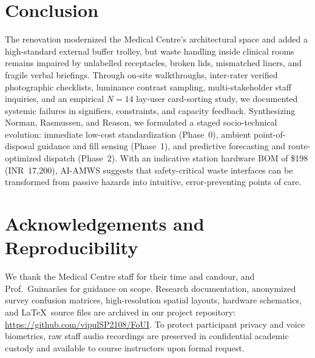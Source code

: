 \documentclass[10pt,twocolumn,a4paper]{article}
\begin{document}
\section{Conclusion}
The renovation modernized the Medical Centre's architectural space and added a high-standard external buffer trolley, but waste handling inside clinical rooms remains impaired by unlabelled receptacles, broken lids, mismatched liners, and fragile verbal briefings. Through on-site walkthroughs, inter-rater verified photographic checklists, luminance contrast sampling, multi-stakeholder staff inquiries, and an empirical $N=14$ lay-user card-sorting study, we documented systemic failures in signifiers, constraints, and capacity feedback. Synthesizing Norman, Rasmussen, and Reason, we formulated a staged socio-technical evolution: immediate low-cost standardization (Phase~0), ambient point-of-disposal guidance and fill sensing (Phase~1), and predictive forecasting and route-optimized dispatch (Phase~2). With an indicative station hardware BOM of \$198 (INR~17,200), AI-AMWS suggests that safety-critical waste interfaces can be transformed from passive hazards into intuitive, error-preventing points of care.

\section*{Acknowledgements and Reproducibility}
We thank the Medical Centre staff for their time and candour, and Prof.\ Guimar\~aes for guidance on scope. Research documentation, anonymized survey confusion matrices, high-resolution spatial layouts, hardware schematics, and \LaTeX\ source files are archived in our project repository: \url{https://github.com/vipulSP2108/FoUI}. To protect participant privacy and voice biometrics, raw staff audio recordings are preserved in confidential academic custody and available to course instructors upon formal request.
\end{document}
